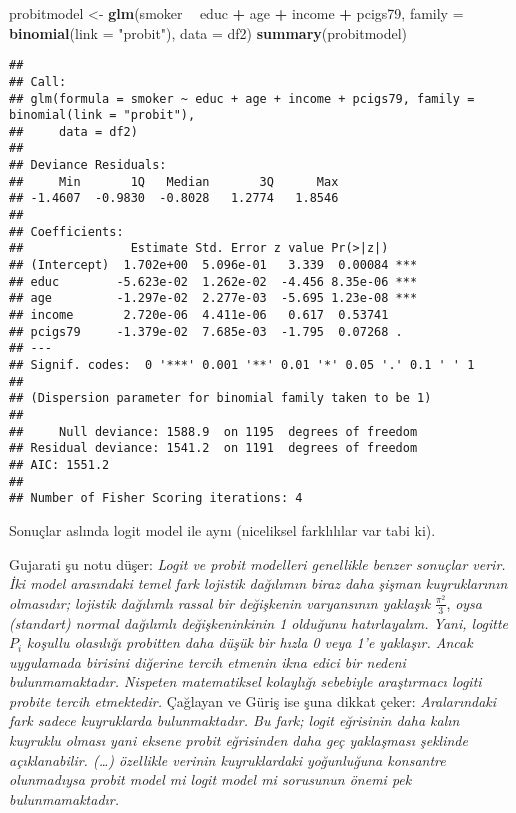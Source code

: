 \documentclass[
]{book}
\newenvironment{Shaded}{\begin{snugshade}}{\end{snugshade}}
\newcommand{\DataTypeTok}[1]{\textcolor[rgb]{0.13,0.29,0.53}{#1}}
\newcommand{\KeywordTok}[1]{\textcolor[rgb]{0.13,0.29,0.53}{\textbf{#1}}}
\newcommand{\NormalTok}[1]{#1}
\newcommand{\OperatorTok}[1]{\textcolor[rgb]{0.81,0.36,0.00}{\textbf{#1}}}
\newcommand{\StringTok}[1]{\textcolor[rgb]{0.31,0.60,0.02}{#1}}
\begin{document}
\begin{Shaded}
\begin{Highlighting}[]
\NormalTok{probitmodel <-}\StringTok{ }\KeywordTok{glm}\NormalTok{(smoker }\OperatorTok{~}\StringTok{ }\NormalTok{educ }\OperatorTok{+}\StringTok{ }\NormalTok{age }\OperatorTok{+}\StringTok{ }\NormalTok{income }\OperatorTok{+}\StringTok{ }\NormalTok{pcigs79, }\DataTypeTok{family =} \KeywordTok{binomial}\NormalTok{(}\DataTypeTok{link =} \StringTok{"probit"}\NormalTok{), }\DataTypeTok{data =}\NormalTok{ df2)}
\KeywordTok{summary}\NormalTok{(probitmodel)}
\end{Highlighting}
\end{Shaded}

\begin{verbatim}
## 
## Call:
## glm(formula = smoker ~ educ + age + income + pcigs79, family = binomial(link = "probit"), 
##     data = df2)
## 
## Deviance Residuals: 
##     Min       1Q   Median       3Q      Max  
## -1.4607  -0.9830  -0.8028   1.2774   1.8546  
## 
## Coefficients:
##               Estimate Std. Error z value Pr(>|z|)    
## (Intercept)  1.702e+00  5.096e-01   3.339  0.00084 ***
## educ        -5.623e-02  1.262e-02  -4.456 8.35e-06 ***
## age         -1.297e-02  2.277e-03  -5.695 1.23e-08 ***
## income       2.720e-06  4.411e-06   0.617  0.53741    
## pcigs79     -1.379e-02  7.685e-03  -1.795  0.07268 .  
## ---
## Signif. codes:  0 '***' 0.001 '**' 0.01 '*' 0.05 '.' 0.1 ' ' 1
## 
## (Dispersion parameter for binomial family taken to be 1)
## 
##     Null deviance: 1588.9  on 1195  degrees of freedom
## Residual deviance: 1541.2  on 1191  degrees of freedom
## AIC: 1551.2
## 
## Number of Fisher Scoring iterations: 4
\end{verbatim}

Sonuçlar aslında logit model ile aynı (niceliksel farklılılar var tabi ki).

Gujarati şu notu düşer: \emph{Logit ve probit modelleri genellikle benzer sonuçlar verir. İki model arasındaki temel fark lojistik dağılımın biraz daha şişman kuyruklarının olmasıdır; lojistik dağılımlı rassal bir değişkenin varyansının yaklaşık} \(\frac{\pi^2}{3}\), \emph{oysa (standart) normal dağılımlı değişkeninkinin 1 olduğunu hatırlayalım. Yani, logitte} \(P_i\) \emph{koşullu olasılığı probitten daha düşük bir hızla 0 veya 1'e yaklaşır. Ancak uygulamada birisini diğerine tercih etmenin ikna edici bir nedeni bulunmamaktadır. Nispeten matematiksel kolaylığı sebebiyle araştırmacı logiti probite tercih etmektedir.} Çağlayan ve Güriş ise şuna dikkat çeker: \emph{Aralarındaki fark sadece kuyruklarda bulunmaktadır. Bu fark; logit eğrisinin daha kalın kuyruklu olması yani eksene probit eğrisinden daha geç yaklaşması şeklinde açıklanabilir. (\ldots) özellikle verinin kuyruklardaki yoğunluğuna konsantre olunmadıysa probit model mi logit model mi sorusunun önemi pek bulunmamaktadır.}
\end{document}

